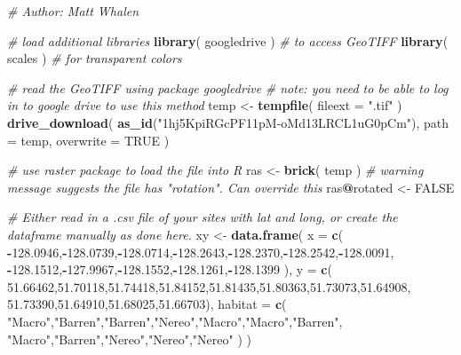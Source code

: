 \documentclass[]{book}
\newenvironment{Shaded}{\begin{snugshade}}{\end{snugshade}}
\newcommand{\KeywordTok}[1]{\textcolor[rgb]{0.13,0.29,0.53}{\textbf{#1}}}
\newcommand{\DataTypeTok}[1]{\textcolor[rgb]{0.13,0.29,0.53}{#1}}
\newcommand{\FloatTok}[1]{\textcolor[rgb]{0.00,0.00,0.81}{#1}}
\newcommand{\StringTok}[1]{\textcolor[rgb]{0.31,0.60,0.02}{#1}}
\newcommand{\CommentTok}[1]{\textcolor[rgb]{0.56,0.35,0.01}{\textit{#1}}}
\newcommand{\OtherTok}[1]{\textcolor[rgb]{0.56,0.35,0.01}{#1}}
\newcommand{\OperatorTok}[1]{\textcolor[rgb]{0.81,0.36,0.00}{\textbf{#1}}}
\newcommand{\NormalTok}[1]{#1}
\begin{document}
\begin{Shaded}
\begin{Highlighting}[]
\CommentTok{# Author: Matt Whalen}

\CommentTok{# load additional libraries}
\KeywordTok{library}\NormalTok{( googledrive ) }\CommentTok{# to access GeoTIFF}
\KeywordTok{library}\NormalTok{( scales ) }\CommentTok{# for transparent colors}

\CommentTok{# read the GeoTIFF using package googledrive}
\CommentTok{# note: you need to be able to log in to google drive to use this method}
\NormalTok{temp <-}\StringTok{ }\KeywordTok{tempfile}\NormalTok{( }\DataTypeTok{fileext =} \StringTok{".tif"}\NormalTok{ )}
\KeywordTok{drive_download}\NormalTok{( }
  \KeywordTok{as_id}\NormalTok{(}\StringTok{"1hj5KpiRGcPF11pM-oMd13LRCL1uG0pCm"}\NormalTok{), }\DataTypeTok{path =}\NormalTok{ temp, }\DataTypeTok{overwrite =} \OtherTok{TRUE}\NormalTok{ )}

\CommentTok{# use raster package to load the file into R}
\NormalTok{ras <-}\StringTok{ }\KeywordTok{brick}\NormalTok{( temp )}
\CommentTok{# warning message suggests the file has "rotation". Can override this}
\NormalTok{ras}\OperatorTok{@}\NormalTok{rotated <-}\StringTok{ }\OtherTok{FALSE}

\CommentTok{# Either read in a .csv file of your sites with lat and long, or create the dataframe manually as done here.}
\NormalTok{xy <-}\StringTok{ }\KeywordTok{data.frame}\NormalTok{(}
  \DataTypeTok{x =} \KeywordTok{c}\NormalTok{( }\OperatorTok{-}\FloatTok{128.0946}\NormalTok{,}\OperatorTok{-}\FloatTok{128.0739}\NormalTok{,}\OperatorTok{-}\FloatTok{128.0714}\NormalTok{,}\OperatorTok{-}\FloatTok{128.2643}\NormalTok{,}\OperatorTok{-}\FloatTok{128.2370}\NormalTok{,}\OperatorTok{-}\FloatTok{128.2542}\NormalTok{,}\OperatorTok{-}\FloatTok{128.0091}\NormalTok{,}
         \OperatorTok{-}\FloatTok{128.1512}\NormalTok{,}\OperatorTok{-}\FloatTok{127.9967}\NormalTok{,}\OperatorTok{-}\FloatTok{128.1552}\NormalTok{,}\OperatorTok{-}\FloatTok{128.1261}\NormalTok{,}\OperatorTok{-}\FloatTok{128.1399}\NormalTok{ ),}
  \DataTypeTok{y =} \KeywordTok{c}\NormalTok{( }\FloatTok{51.66462}\NormalTok{,}\FloatTok{51.70118}\NormalTok{,}\FloatTok{51.74418}\NormalTok{,}\FloatTok{51.84152}\NormalTok{,}\FloatTok{51.81435}\NormalTok{,}\FloatTok{51.80363}\NormalTok{,}\FloatTok{51.73073}\NormalTok{,}\FloatTok{51.64908}\NormalTok{,}
        \FloatTok{51.73390}\NormalTok{,}\FloatTok{51.64910}\NormalTok{,}\FloatTok{51.68025}\NormalTok{,}\FloatTok{51.66703}\NormalTok{),}
  \DataTypeTok{habitat =} \KeywordTok{c}\NormalTok{( }\StringTok{"Macro"}\NormalTok{,}\StringTok{"Barren"}\NormalTok{,}\StringTok{"Barren"}\NormalTok{,}\StringTok{"Nereo"}\NormalTok{,}\StringTok{"Macro"}\NormalTok{,}\StringTok{"Macro"}\NormalTok{,}\StringTok{"Barren"}\NormalTok{,}
               \StringTok{"Macro"}\NormalTok{,}\StringTok{"Barren"}\NormalTok{,}\StringTok{"Nereo"}\NormalTok{,}\StringTok{"Nereo"}\NormalTok{,}\StringTok{"Nereo"}\NormalTok{ )}
\NormalTok{)}


\end{Highlighting}
\end{Shaded}
\end{document}
